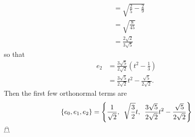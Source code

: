 \documentclass{article}
\begin{document}
\begin{itemize}
\begin{align*}
        &= \sqrt{\frac{2}{5} - \frac{2}{9}}\\
        &= \sqrt{\frac{8}{45}}\\
        &= \frac{2\sqrt{2}}{3\sqrt{5}}
    \end{align*}
    so that
    \begin{align*}
        e_2 &= \frac{3\sqrt{5}}{2\sqrt{2}}\left(t^2 - \frac{1}{3}\right)\\
        &= \frac{3\sqrt{5}}{2\sqrt{2}}t^2 - \frac{\sqrt{5}}{2\sqrt{2}}.
    \end{align*}
    Then the first few orthonormal terms are 
    \[\{e_0,e_1,e_2\} = \left\{\frac{1}{\sqrt{2}}, \hspace{0.5em} \sqrt{\frac{3}{2}}t, \hspace{0.5em} \frac{3\sqrt{5}}{2\sqrt{2}}t^2 - \frac{\sqrt{5}}{2\sqrt{2}}\right\}\]
    \hfill $\mathghost$
\end{itemize}
\end{document}
